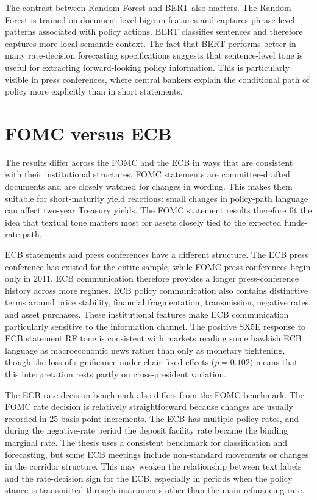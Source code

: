 The contrast between Random Forest and BERT also matters. The Random
Forest is trained on document-level bigram features and captures phrase-level
patterns associated with policy actions. BERT classifies sentences and
therefore captures more local semantic context. The fact that BERT
performs better in many rate-decision forecasting specifications suggests that
sentence-level tone is useful for extracting forward-looking policy information.
This is particularly visible in press conferences, where central bankers explain
the conditional path of policy more explicitly than in short statements.

\section{FOMC versus ECB}
\label{sec:disc_fomc_ecb}

The results differ across the FOMC and the ECB in ways that are consistent with
their institutional structures. FOMC statements are committee-drafted documents
and are closely watched for changes in wording. This makes them suitable for
short-maturity yield reactions: small changes in policy-path language can affect
two-year Treasury yields. The FOMC statement results therefore fit the idea that
textual tone matters most for assets closely tied to the expected funds-rate
path.

ECB statements and press conferences have a different structure. The ECB press
conference has existed for the entire sample, while FOMC press conferences begin
only in 2011. ECB communication therefore provides a longer press-conference
history across more regimes. ECB policy communication also contains distinctive
terms around price stability, financial fragmentation, transmission, negative
rates, and asset purchases. These institutional features make ECB communication
particularly sensitive to the information channel. The positive SX5E response
to ECB statement RF tone is consistent with markets reading some hawkish ECB
language as macroeconomic news rather than only as monetary tightening, though
the loss of significance under chair fixed effects ($p=0.102$) means that this
interpretation rests partly on cross-president variation.

The ECB rate-decision benchmark also differs from the FOMC benchmark. The FOMC
rate decision is relatively straightforward because changes are usually recorded
in 25-basis-point increments. The ECB has multiple policy rates, and during the
negative-rate period the deposit facility rate became the binding marginal rate.
The thesis uses a consistent benchmark for classification and forecasting, but
some ECB meetings include non-standard movements or changes in the corridor
structure. This may weaken the relationship between text labels and the
rate-decision sign for the ECB, especially in periods when the policy stance is
transmitted through instruments other than the main refinancing rate.

